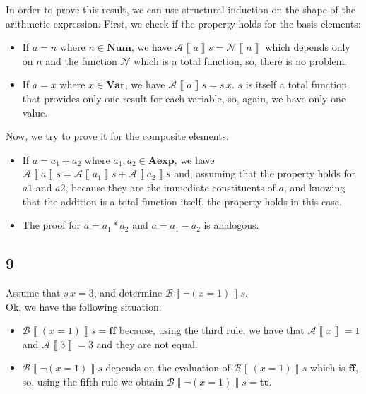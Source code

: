 \documentclass[spanish, a4paper, 12pt] {article}
\newcommand{\aexp}[0]{\textbf{Aexp}}
\newcommand{\ff}[0]{\textbf{ff}}
\newcommand{\num}[0]{\textbf{Num}}
\newcommand{\Tt}[0]{\textbf{tt}}
\newcommand{\var}[0]{\textbf{Var}}
\newcommand{\A}[0]{\mathcal{A}}
\newcommand{\B}[0]{\mathcal{B}}
\newcommand{\N}[0]{\mathcal{N}}
\newcommand{\eval}[1]{\left\llbracket #1 \right\rrbracket}
\renewcommand{\=}[0]{:=}
\renewcommand{\;}[0]{\mbox{; }}
\begin{document}
In order to prove this result, we can use structural induction on the shape of the arithmetic expression. First, we check if the property holds for the basis elements:
\begin{itemize}
    \item If $a = n$ where $n \in \num$, we have $\A\eval{a}s = \N\eval{n}$ which depends only on $n$ and the function $\N$ which is a total function, so, there is no problem.
    \item If $a = x$ where $x \in \var$, we have $\A\eval{a}s = s\,x$. $s$ is itself a total function that provides only one result for each variable, so, again, we have only one value.
\end{itemize}%
Now, we try to prove it for the composite elements:
\begin{itemize}
    \item If $a = a_1 + a_2$ where $a_1, a_2 \in \aexp$, we have $\A\eval{a}s = \A\eval{a_1}s + \A\eval{a_2}s$ and, assuming that the property holds for $a1$ and $a2$, because they are the immediate constituents of $a$, and knowing that the addition is a total function itself, the property holds in this case.
    \item The proof for $a = a_1 * a_2$ and $a = a_1 - a_2$ is analogous.
\end{itemize}
\subsection{9}
Assume that $s\,x = 3$, and determine $\B\eval{\neg(x = 1)}s$.\\

Ok, we have the following situation:
\begin{itemize}
    \item $\B\eval{(x = 1)}s = \ff$ because, using the third rule, we have that $\A\eval{x} = 1$ and $\A\eval{3} = 3$ and they are not equal.
    \item $\B\eval{\neg(x = 1)}s$ depends on the evaluation of $\B\eval{(x = 1)}s$ which is $\ff$, so, using the fifth rule we obtain $\B\eval{\neg(x = 1)}s = \Tt$.
\end{itemize}
\end{document}
